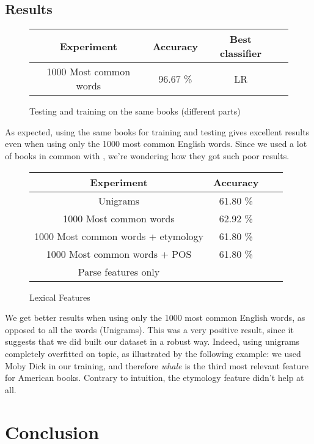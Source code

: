 \documentclass[10pt]{article}
\begin{document}
\subsection{Results}
\begin{figure}[h]
\centering\begin{tabular}{|c|c|c|c|}
\hline 
Experiment & Accuracy & Best classifier\\
\hline 
1000 Most common words & 96.67 \% & LR \\
\hline
\end{tabular}
\caption{Testing and training on the same books (different parts)}
\end{figure}
As expected, using the same books for training and testing gives excellent results even when using only the 1000 most common English words. Since we used a lot of books in common with \cite{homemade}, we're wondering how they got such poor results.

\begin{figure}[h]
\centering\begin{tabular}{|c|c|c|c|}
\hline 
Experiment & Accuracy \\
\hline 
Unigrams & 61.80 \% \\
1000 Most common words & 62.92 \%  \\
1000 Most common words + etymology & 61.80 \%  \\
1000 Most common words + POS & 61.80 \%  \\
\hline
Parse features only & \\
\hline
\end{tabular}
\caption{Lexical Features}
\end{figure}
We get better results when using only the 1000 most common English words, as opposed to all the words (Unigrams). This was a very positive result, since it suggests that we did built our dataset in a robust way. Indeed, using unigrams completely overfitted on topic, as illustrated by the following example: we used Moby Dick in our training, and therefore \emph{whale} is the third most relevant feature for American books. Contrary to intuition, the etymology feature didn't help at all.


\section{Conclusion}



\end{document}
